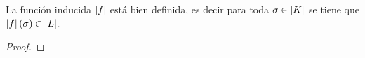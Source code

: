 \begin{ejercicio}\label{ej:54}
  La funci\'on inducida $\left| f \right|$ est\'a bien definida, es decir para toda $\sigma\in\left| K \right|$ se tiene que
  $\left| f \right|(\sigma)\in\left| L \right|$.
\end{ejercicio}
\begin{proof}%

\end{proof}%

